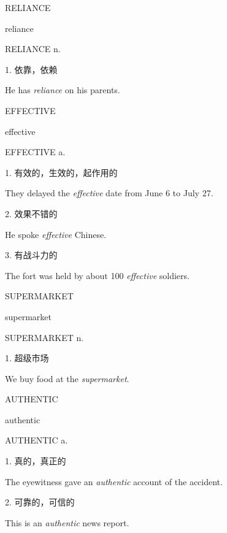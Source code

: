 \begin{flashcard}{
RELIANCE

reliance
}
\begin{center}
RELIANCE n. 
\end{center}
1. 依靠，依赖

He has \textit{reliance} on his parents.

\end{flashcard}
\begin{flashcard}{
EFFECTIVE

effective
}
\begin{center}
EFFECTIVE a. 
\end{center}
1. 有效的，生效的，起作用的

They delayed the \textit{effective} date from June 6 to July 27.

2. 效果不错的

He spoke \textit{effective} Chinese.

3. 有战斗力的

The fort was held by about 100 \textit{effective} soldiers.

\end{flashcard}
\begin{flashcard}{
SUPERMARKET

supermarket
}
\begin{center}
SUPERMARKET n. 
\end{center}
1. 超级市场

We buy food at the \textit{supermarket}.

\end{flashcard}
\begin{flashcard}{
AUTHENTIC

authentic
}
\begin{center}
AUTHENTIC a. 
\end{center}
1. 真的，真正的

The eyewitness gave an \textit{authentic} account of the accident.

2. 可靠的，可信的

This is an \textit{authentic} news report.

\end{flashcard}
